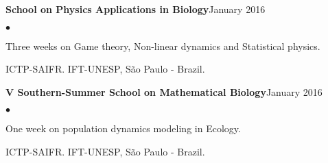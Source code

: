 \documentclass[margin,line]{res}
\newenvironment{list2}{
  \begin{list}{$\bullet$}{%
      \setlength{\itemsep}{0in}
      \setlength{\parsep}{0in} \setlength{\parskip}{0in}
      \setlength{\topsep}{0in} \setlength{\partopsep}{0in}
      \setlength{\leftmargin}{0.2in}}}{\end{list}}
\begin{document}
\begin{resume}

{\bf School on Physics Applications in Biology}\hfill {January 2016}\\
	\vspace*{-.1in}%
\begin{list2} %
	\item Three weeks on Game theory, Non-linear dynamics and Statistical physics.%
	\item ICTP-SAIFR. IFT-UNESP, S{\~a}o Paulo - Brazil. %
\end{list2}

{\bf V Southern-Summer School on Mathematical Biology}\hfill {January 2016}\\
	\vspace*{-.1in}%
\begin{list2} %
	\item One week on population dynamics modeling in Ecology.%
	\item ICTP-SAIFR. IFT-UNESP, S{\~a}o Paulo - Brazil.%
\end{list2}




\end{resume}
\end{document}
